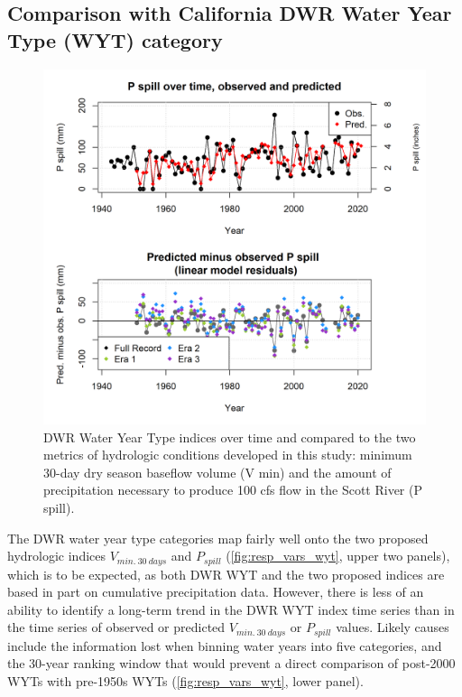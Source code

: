 \documentclass[
]{article}
\begin{document}
\hypertarget{comparison-with-california-dwr-water-year-type-wyt-category}{%
\subsection{Comparison with California DWR Water Year Type (WYT)
category}\label{comparison-with-california-dwr-water-year-type-wyt-category}}

\begin{figure}
\includegraphics[width=1\linewidth]{f16} \caption{\label{fig:resp_vars_wyt} DWR Water Year Type indices over time and compared to the two metrics of hydrologic conditions developed in this study: minimum 30-day dry season baseflow volume (V min) and the amount of precipitation necessary to produce 100 cfs flow in the Scott River (P spill).}\label{fig:resp_vars_wyt}
\end{figure}

The DWR water year type categories map fairly well onto the two proposed
hydrologic indices \(V_{min.~30~days}\) and \(P_{spill}\)
(\autoref{fig:resp_vars_wyt}, upper two panels), which is to be
expected, as both DWR WYT and the two proposed indices are based in part
on cumulative precipitation data. However, there is less of an ability
to identify a long-term trend in the DWR WYT index time series than in
the time series of observed or predicted \(V_{min.~30~days}\) or
\(P_{spill}\) values. Likely causes include the information lost when
binning water years into five categories, and the 30-year ranking window
that would prevent a direct comparison of post-2000 WYTs with pre-1950s
WYTs (\autoref{fig:resp_vars_wyt}, lower panel).
\end{document}
